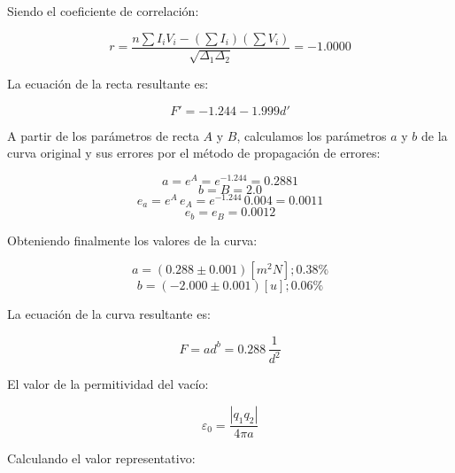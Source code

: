 \documentclass[letter,11pt]{article}
\begin{document}
\begin{enumerate}
    Siendo el coeficiente de correlación:

    \begin{equation*}
        r = \frac{n \sum I_i V_i - (\sum I_i)(\sum V_i)}{\sqrt{\Delta_1 \Delta_2}} = -1.0000
    \end{equation*}

    La ecuación de la recta resultante es:

    \begin{equation*}
        F' = -1.244 - 1.999 d'
    \end{equation*}

    A partir de los parámetros de recta $A$ y $B$, calculamos los parámetros $a$
    y $b$ de la curva original y sus errores por el método de propagación de
    errores:

    \begin{equation*}
        a = e^{A} = e^{-1.244} = 0.2881
    \end{equation*}
    \begin{equation*}
        b = B = 2.0
    \end{equation*}
    \begin{equation*}
        e_a = e^A\, e_A = e^{-1.244}\, 0.004 = 0.0011
    \end{equation*}
    \begin{equation*}
        e_b = e_B = 0.0012
    \end{equation*}

    Obteniendo finalmente los valores de la curva:

    \begin{equation*}
        a = (0.288 \pm 0.001)[m^2 N]; 0.38\%
    \end{equation*}
    \begin{equation*}
        b = (-2.000 \pm 0.001)[u]; 0.06\%
    \end{equation*}

    La ecuación de la curva resultante es:

    \begin{equation*}
        F = a d^b = 0.288\, \frac{1}{d^2}
    \end{equation*}

    El valor de la permitividad del vacío:

    \begin{equation*}
        \varepsilon_0 = \frac{| q_1 q_2 |}{4 \pi a}
    \end{equation*}

    Calculando el valor representativo:


\end{enumerate}
\end{document}
